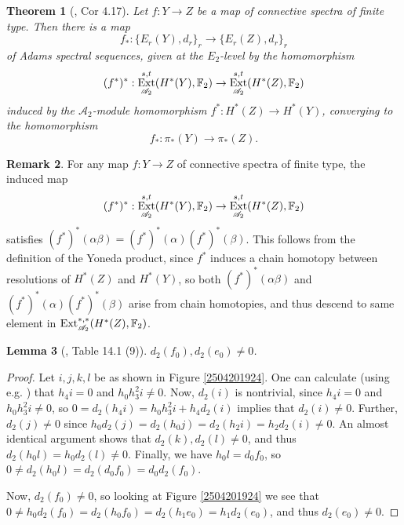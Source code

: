 \documentclass[11pt, titlepage]{article} %
\def\bb{\ensuremath\mathbb}
\def\A{\ensuremath{\mathscr{A}_2}}
\DeclareMathOperator{\Ext}{Ext}
\numberwithin{equation}{subsection}
\theoremstyle{plain}
\newtheorem{theorem}{Theorem}[subsection]
\newtheorem{lemma}[theorem]{Lemma}
\theoremstyle{definition}
\newtheorem{remark}[theorem]{Remark}
\begin{document}
\begin{theorem}[{\autocite{ass}, Cor 4.17}]\label{2504141019}
Let \(f : Y \to Z\) be a map of connective spectra of finite type. Then there is a map
\[f_* : \{E_r(Y), d_r\}_r \to \{E_r(Z), d_r\}_r\]
of Adams spectral sequences, given at the \(E_2\)-level by the homomorphism
\[(f^*)^* : \Ext_{\A}^{s,t}(H^*(Y), \bb{F}_2) \to \Ext^{s,t}_{\A}(H^*(Z), \bb{F}_2)\]
induced by the \(\A\)-module homomorphism \(f^* : H^*(Z)\to H^*(Y)\), converging to the homomorphism 
\[f_* : \pi_*(Y) \to \pi_*(Z).\]
\end{theorem}

\begin{remark}\label{2504211139}
For any map \(f : Y \to Z\) of connective spectra of finite type, the induced map 
\[(f^*)^* : \Ext_{\A}^{s,t}(H^*(Y), \bb{F}_2)\to \Ext^{s,t}_{\A}(H^*(Z), \bb{F}_2)\]
satisfies \((f^*)^*(\alpha \beta)=(f^*)^*(\alpha)(f^*)^*(\beta)\). This follows from the definition of the Yoneda product, since \(f^*\) induces a chain homotopy between resolutions of \(H^*(Z)\) and \(H^*(Y)\), so both \((f^*)^*(\alpha \beta)\) and \((f^*)^*(\alpha)(f^*)^*(\beta)\) arise from chain homotopies, and thus descend to same element in \(\Ext_{\A}^{*,*}(H^*(Z), \bb{F}_2)\).
\end{remark}

\begin{lemma}[{\autocite{rognes2}, Table 14.1 (9)}]\label{2504192017}
\(d_2(f_0), d_2(e_0)\neq 0\).
\end{lemma}

\begin{proof}
Let \(i, j, k, l\) be as shown in Figure \ref{2504201924}. One can calculate (using e.g. \autocite{ext}) that \(h_4i=0\) and \(h_0h_3^2i\neq 0\). Now, \(d_2(i)\) is nontrivial, since \(h_4i=0\) and \(h_0h_3^2i\neq 0\), so \(0=d_2(h_4i)=h_0h_3^2i+h_4d_2(i)\) implies that \(d_2(i)\neq 0\). Further, \(d_2(j)\neq 0\) since \(h_0d_2(j)=d_2(h_0j)=d_2(h_2i)=h_2d_2(i)\neq 0\). An almost identical argument shows that \(d_2(k), d_2(l)\neq0\), and thus \(d_2(h_0l)=h_0d_2(l)\neq 0\). Finally, we have \(h_0l=d_0f_0\), so \(0\neq d_2(h_0l)=d_2(d_0f_0)=d_0d_2(f_0)\).

Now, \(d_2(f_0)\neq 0\), so looking at Figure \ref{2504201924} we see that \(0\neq h_0d_2(f_0)=d_2(h_0f_0)=d_2(h_1e_0)=h_1d_2(e_0)\), and thus \(d_2(e_0)\neq 0\).
\end{proof}
\end{document}
